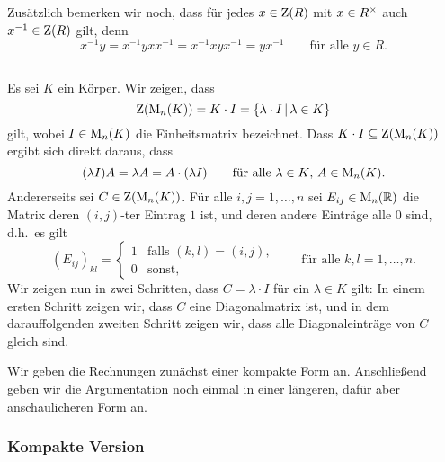 Zusätzlich bemerken wir noch, dass für jedes $x \in \operatorname{Z}(R)$ mit $x \in {R}^\times$ auch $x^{-1} \in \operatorname{Z}(R)$ gilt, denn
\[
    x^{-1} y
  = x^{-1} y x x^{-1}
  = x^{-1} x y x^{-1}
  = y x^{-1}
  \qquad
  \text{für alle $y \in R$}.
\]





\subsection{}
Es sei $K$ ein Körper.
Wir zeigen, dass
\[
    \operatorname{Z}(\operatorname{M}_{n}(K))
  = K \cdot I
  = \{\lambda \cdot I \,|\, \lambda \in K\}
\]
gilt, wobei $I \in \operatorname{M}_{n}(K)$ die Einheitsmatrix bezeichnet.
Dass $K \cdot I \subseteq \operatorname{Z}(\operatorname{M}_{n}(K))$ ergibt sich direkt daraus, dass
\[
    (\lambda I) A
  = \lambda A
  = A \cdot (\lambda I)
  \qquad
  \text{für alle $\lambda \in K$, $A \in \operatorname{M}_{n}(K)$}.
\]
Andererseits sei $C \in \operatorname{Z}(\operatorname{M}_{n}(K))$.
Für alle $i,j = 1, \dotsc, n$ sei $E_{ij} \in \operatorname{M}_{n}(\mathbb{R})$ die Matrix deren $(i,j)$-ter Eintrag $1$ ist, und deren andere Einträge alle $0$ sind, d.h.\ es gilt
\[
    (E_{ij})_{kl}
  = \begin{cases}
      1 & \text{falls $(k,l) = (i,j)$}, \\
      0 & \text{sonst},
    \end{cases}
    \qquad
    \text{für alle $k,l = 1, \dotsc, n$}.
\]
Wir zeigen nun in zwei Schritten, dass $C = \lambda \cdot I$ für ein $\lambda \in K$ gilt:
In einem ersten Schritt zeigen wir, dass $C$ eine Diagonalmatrix ist, und in dem darauffolgenden zweiten Schritt zeigen wir, dass alle Diagonaleinträge von $C$ gleich sind.

Wir geben die Rechnungen zunächst einer kompakte Form an.
Anschließend geben wir die Argumentation noch einmal in einer längeren, dafür aber anschaulicheren Form an.



\subsubsection{Kompakte Version}

